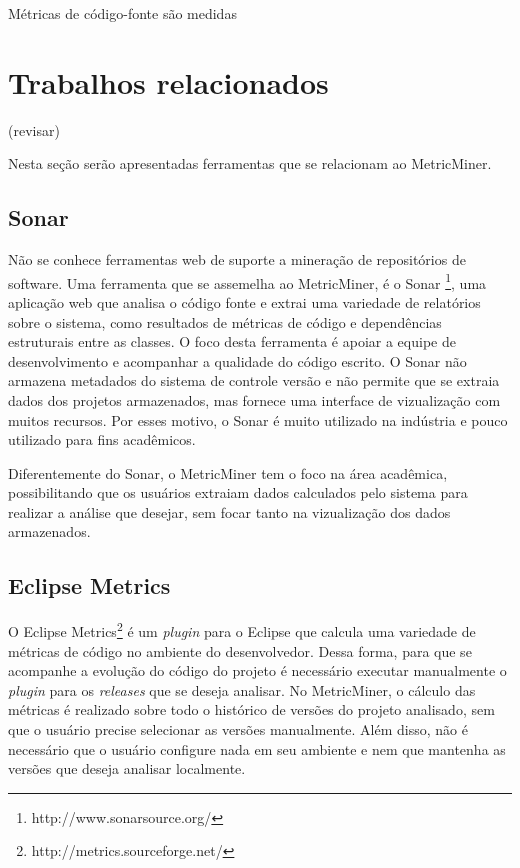 \documentclass[a4paper, 12pt, twoside]{book}
\begin{document}
        Métricas de código-fonte são medidas 


\chapter{Trabalhos relacionados} \label{ch:trabalhos}

(revisar)

Nesta seção serão apresentadas ferramentas que se relacionam ao MetricMiner.
\section{Sonar}
    Não se conhece ferramentas web de suporte a mineração de repositórios de software. Uma ferramenta que se assemelha ao MetricMiner, é o Sonar \footnote{http://www.sonarsource.org/}, uma aplicação web que analisa o código fonte e extrai uma variedade de relatórios sobre o sistema, como resultados de métricas de código e dependências estruturais entre as classes. O foco desta ferramenta é apoiar a equipe de desenvolvimento e acompanhar a qualidade do código escrito. O Sonar não armazena metadados do sistema de controle versão e não permite que se extraia dados dos projetos armazenados, mas fornece uma interface de vizualização com muitos recursos. Por esses motivo, o Sonar é muito utilizado na indústria e pouco utilizado para fins acadêmicos.
    
    Diferentemente do Sonar, o MetricMiner tem o foco na área acadêmica, possibilitando que os usuários extraiam dados calculados pelo sistema para realizar a análise que desejar, sem focar tanto na vizualização dos dados armazenados.

\section{Eclipse Metrics}
    O Eclipse Metrics\footnote{http://metrics.sourceforge.net/} é um \textit{plugin} para o Eclipse que calcula uma variedade de métricas de código no ambiente do desenvolvedor. Dessa forma, para que se acompanhe a evolução do código do projeto é necessário executar manualmente o \textit{plugin} para os \textit{releases} que se deseja analisar. No MetricMiner, o cálculo das métricas é realizado sobre todo o histórico de versões do projeto analisado, sem que o usuário precise selecionar as versões manualmente. Além disso, não é necessário que o usuário configure nada em seu ambiente e nem que mantenha as versões que deseja analisar localmente.
    
\end{document}
